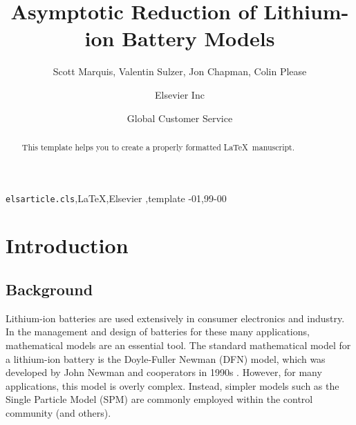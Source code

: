 \documentclass[preprint]{elsarticle}
\begin{document}
\begin{frontmatter}


\title{Asymptotic Reduction of Lithium-ion Battery Models}

\author{Scott Marquis, Valentin Sulzer, Jon Chapman, Colin Please}
\address{University of Oxford}

\author[mymainaddress,mysecondaryaddress]{Elsevier Inc}

\author[mysecondaryaddress]{Global Customer Service}

\address[mymainaddress]{1600 John F Kennedy Boulevard, Philadelphia}
\address[mysecondaryaddress]{360 Park Avenue South, New York}

\begin{abstract}
This template helps you to create a properly formatted \LaTeX\ manuscript.
\end{abstract}

\begin{keyword}
\texttt{elsarticle.cls}\sep \LaTeX\sep Elsevier \sep template
-01\sep  99-00
\end{keyword}

\end{frontmatter}

\linenumbers

\section{Introduction} 
\subsection{Background}
Lithium-ion batteries are used extensively in consumer electronics and industry. In the management and design of batteries for these many applications, mathematical models are an essential tool. The standard mathematical model for a lithium-ion battery is the Doyle-Fuller Newman (DFN) model, which was developed by John Newman and cooperators in 1990s \cite{doyle,Fuller1994,newman_book}. However, for many applications, this model is overly complex. Instead, simpler models such as the Single Particle Model (SPM) are commonly employed within the control community \cite{Moura2017} (and others). \\
\end{document}
